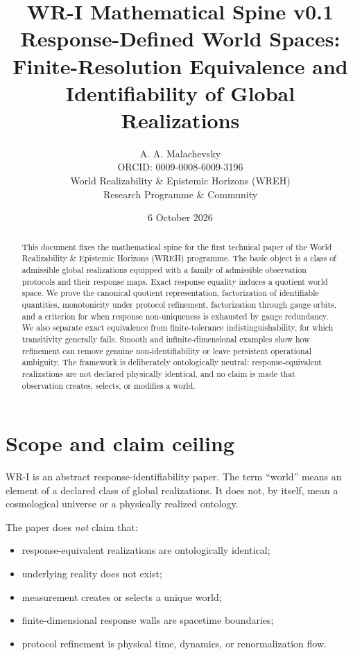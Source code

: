 \documentclass[11pt]{article}
\title{\textbf{WR-I Mathematical Spine v0.1}\\[4pt]
\large Response-Defined World Spaces:\\
Finite-Resolution Equivalence and Identifiability of Global Realizations}
\author{A. A. Malachevsky\\
ORCID: 0009-0008-6009-3196\\
World Realizability \& Epistemic Horizons (WREH)\\
Research Programme \& Community}
\date{6 October 2026}
\begin{document}
\maketitle

\begin{abstract}
This document fixes the mathematical spine for the first technical paper of the
World Realizability \& Epistemic Horizons (WREH) programme.  The basic object is
a class of admissible global realizations equipped with a family of admissible
observation protocols and their response maps.  Exact response equality induces
a quotient world space.  We prove the canonical quotient representation,
factorization of identifiable quantities, monotonicity under protocol
refinement, factorization through gauge orbits, and a criterion for when
response non-uniqueness is exhausted by gauge redundancy.  We also separate
exact equivalence from finite-tolerance indistinguishability, for which
transitivity generally fails.  Smooth and infinite-dimensional examples show
how refinement can remove genuine non-identifiability or leave persistent
operational ambiguity.  The framework is deliberately ontologically neutral:
response-equivalent realizations are not declared physically identical, and no
claim is made that observation creates, selects, or modifies a world.
\end{abstract}

\section{Scope and claim ceiling}

WR-I is an abstract response-identifiability paper.  The term ``world'' means
an element of a declared class of global realizations.  It does not, by itself,
mean a cosmological universe or a physically realized ontology.

The paper does \emph{not} claim that:
\begin{itemize}
  \item response-equivalent realizations are ontologically identical;
  \item underlying reality does not exist;
  \item measurement creates or selects a unique world;
  \item finite-dimensional response walls are spacetime boundaries;
  \item protocol refinement is physical time, dynamics, or renormalization flow.
\end{itemize}
\end{document}
